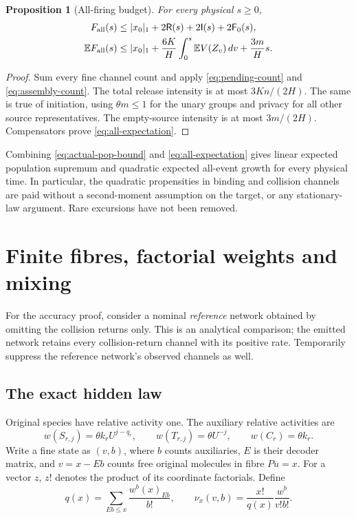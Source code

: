 \documentclass[11pt,reqno]{amsart}
\newtheorem{proposition}[theorem]{Proposition}
\theoremstyle{definition}
\theoremstyle{remark}
\newcommand{\E}{\mathbb E}
\begin{document}
\begin{proposition}[All-firing budget]\label{prop:all-firings}
For every physical $s\ge0$,
\begin{align}
 F_{\rm all}(s)&\le |x_0|_1+2\mathsf R(s)+2\mathsf I(s)+2\mathsf F_0(s),
 \label{eq:all-count}\\
 \E F_{\rm all}(s)&\le |x_0|_1+
 \frac{6K}{H}\int_0^s\E V(Z_v)\,dv+\frac{3m}{H}s.\label{eq:all-expectation}
\end{align}
\end{proposition}
\begin{proof}
Sum every fine channel count and apply \eqref{eq:pending-count} and
\eqref{eq:assembly-count}. The total release intensity is at most
$3Kn/(2H)$. The same is true of initiation, using $\theta m\le1$ for the
unary groups and privacy for all other source representatives. The
empty-source intensity is at most $3m/(2H)$. Compensators prove
\eqref{eq:all-expectation}.
\end{proof}

Combining \eqref{eq:actual-pop-bound} and \eqref{eq:all-expectation} gives
linear expected population supremum and quadratic expected all-event growth
for every physical time. In particular, the quadratic propensities in binding
and collision channels are paid without a second-moment assumption on the
target, or any stationary-law argument. Rare excursions have not been removed.

\section{Finite fibres, factorial weights and mixing}\label{sec:fibre}
For the accuracy proof, consider a nominal \emph{reference} network obtained by
omitting the collision returns only. This is an analytical comparison; the
emitted network retains every collision-return channel with its positive rate.
Temporarily suppress the reference network's observed channels as well.

\subsection{The exact hidden law}
Original species have relative activity one. The auxiliary relative activities
are
\begin{equation}\label{eq:weights}
 w(S_{r,j})=\theta k_r U^{j-q_r},\qquad
 w(T_{r,j})=\theta U^{-j},\qquad w(C_r)=\theta k_r.
\end{equation}
Write a fine state as $(v,b)$, where $b$ counts auxiliaries, $E$ is their
decoder matrix, and $v=x-Eb$ counts free original molecules in fibre $Pu=x$.
For a vector $z$, $z!$ denotes the product of its coordinate factorials.
Define
\begin{equation}\label{eq:partition}
 q(x)=\sum_{Eb\le x}\frac{w^b(x)_{Eb}}{b!},\qquad
 \nu_x(v,b)=\frac{x!}{q(x)}\frac{w^b}{v!b!}.
\end{equation}
\end{document}
